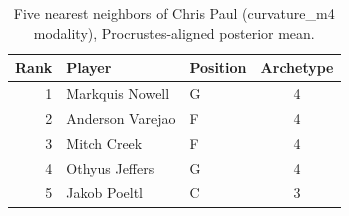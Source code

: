 \begin{table}[htbp]
  \centering\small
  \begin{tabular}{rllc}
    \toprule
    Rank & Player & Position & Archetype \\
    \midrule
    1 & Markquis Nowell & G & 4 \\
    2 & Anderson Varejao & F & 4 \\
    3 & Mitch Creek & F & 4 \\
    4 & Othyus Jeffers & G & 4 \\
    5 & Jakob Poeltl & C & 3 \\
    \bottomrule
  \end{tabular}
  \caption{Five nearest neighbors of Chris Paul (curvature_m4 modality), Procrustes-aligned posterior mean.}
  \label{tab:Chris_Paul_neighbors_curvature_m4}
\end{table}

